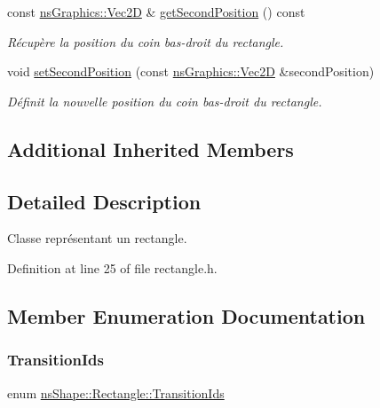 \begin{DoxyCompactItemize}
const \hyperlink{classns_graphics_1_1_vec2_d}{ns\+Graphics\+::\+Vec2D} \& \hyperlink{classns_shape_1_1_rectangle_a276bce487fbd9514fcf8e558382d0276}{get\+Second\+Position} () const
\begin{DoxyCompactList}\small\item\em Récupère la position du coin bas-\/droit du rectangle. \end{DoxyCompactList}\item 
void \hyperlink{classns_shape_1_1_rectangle_ada11c6f627048c51dce9544bff758db4}{set\+Second\+Position} (const \hyperlink{classns_graphics_1_1_vec2_d}{ns\+Graphics\+::\+Vec2D} \&second\+Position)
\begin{DoxyCompactList}\small\item\em Définit la nouvelle position du coin bas-\/droit du rectangle. \end{DoxyCompactList}\end{DoxyCompactItemize}
\subsection*{Additional Inherited Members}


\subsection{Detailed Description}
Classe représentant un rectangle. 

Definition at line 25 of file rectangle.\+h.



\subsection{Member Enumeration Documentation}
\mbox{\label{classns_shape_1_1_rectangle_a7c29d64ac1e4ed57a3d70b5616813247}} 
\subsubsection{\texorpdfstring{Transition\+Ids}{TransitionIds}}
{\footnotesize\ttfamily enum \hyperlink{classns_shape_1_1_rectangle_a7c29d64ac1e4ed57a3d70b5616813247}{ns\+Shape\+::\+Rectangle\+::\+Transition\+Ids}}



